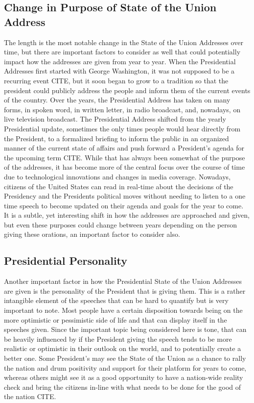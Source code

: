 \subsection{Change in Purpose of State of the Union Address}
The length is the most notable change in the State of the Union Addresses over time, but there are important factors to consider as well that could potentially impact how the addresses are given from year to year.
When the Presidential Addresses first started with George Washington, it was not supposed to be a recurring event CITE, but it soon began to grow to a tradition so that the president could publicly address the people and inform them of the current events of the country.
Over the years, the Presidential Address has taken on many forms, in spoken word, in written letter, in radio broadcast, and, nowadays, on live television broadcast.
The Presidential Address shifted from the yearly Presidential update, sometimes the only times people would hear directly from the President, to a formalized briefing to inform the public in an organized manner of the current state of affairs and push forward a President's agenda for the upcoming term CITE.
While that has always been somewhat of the purpose of the addresses, it has become more of the central focus over the course of time due to technological innovations and changes in media coverage.
Nowadays, citizens of the United States can read in real-time about the decisions of the Presidency and the Presidents political moves without needing to listen to a one time speech to become updated on their agenda and goals for the year to come.
It is a subtle, yet interesting shift in how the addresses are approached and given, but even these purposes could change between years depending on the person giving these orations, an important factor to consider also.

\subsection{Presidential Personality}
Another important factor in how the Presidential State of the Union Addresses are given is the personality of the President that is giving them.
This is a rather intangible element of the speeches that can be hard to quantify but is very important to note.
Most people have a certain disposition towards being on the more optimistic or pessimistic side of life and that can display itself in the speeches given.
Since the important topic being considered here is tone, that can be heavily influenced by if the President giving the speech tends to be more realistic or optimistic in their outlook on the world, and to potentially create a better one.
Some President's may see the State of the Union as a chance to rally the nation and drum positivity and support for their platform for years to come, whereas others might see it as a good opportunity to have a nation-wide reality check and bring the citizens in-line with what needs to be done for the good of the nation CITE.

